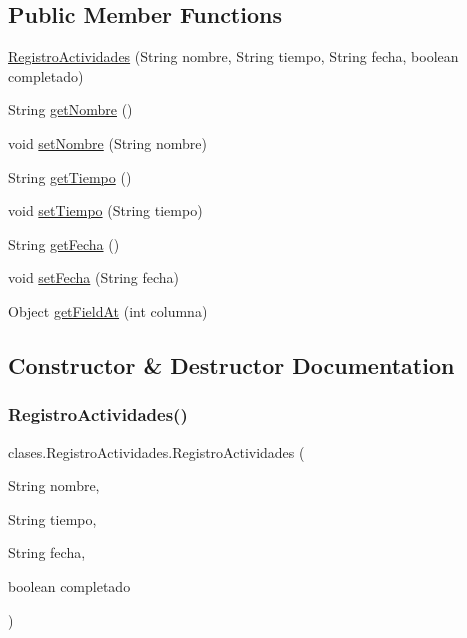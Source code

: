 \subsection*{Public Member Functions}
\begin{DoxyCompactItemize}
\item 
\mbox{\hyperlink{classclases_1_1_registro_actividades_a024588a40718bcdafca472f9ead9f57d}{Registro\+Actividades}} (String nombre, String tiempo, String fecha, boolean completado)
\item 
String \mbox{\hyperlink{classclases_1_1_registro_actividades_a9984e514a1c330fe6d0c4470ad8c2f92}{get\+Nombre}} ()
\item 
void \mbox{\hyperlink{classclases_1_1_registro_actividades_a508d70a72b0d5a122068ad4031a66af0}{set\+Nombre}} (String nombre)
\item 
String \mbox{\hyperlink{classclases_1_1_registro_actividades_afbe2b3b67d60b42f4e110c0f05514850}{get\+Tiempo}} ()
\item 
void \mbox{\hyperlink{classclases_1_1_registro_actividades_a6fbf13972bbe9cfc5c5b2601e280b615}{set\+Tiempo}} (String tiempo)
\item 
String \mbox{\hyperlink{classclases_1_1_registro_actividades_a0a5376b0c5899d26b845381b73983d3e}{get\+Fecha}} ()
\item 
void \mbox{\hyperlink{classclases_1_1_registro_actividades_aed408c87acaea7bf25e63d726b85f28b}{set\+Fecha}} (String fecha)
\item 
Object \mbox{\hyperlink{classclases_1_1_registro_actividades_a2db7606bb64aa1fa92ee87365bdf5ae3}{get\+Field\+At}} (int columna)
\end{DoxyCompactItemize}


\subsection{Constructor \& Destructor Documentation}
\mbox{\label{classclases_1_1_registro_actividades_a024588a40718bcdafca472f9ead9f57d}} 
\subsubsection{\texorpdfstring{Registro\+Actividades()}{RegistroActividades()}}
{\footnotesize\ttfamily clases.\+Registro\+Actividades.\+Registro\+Actividades (\begin{DoxyParamCaption}\item[{String}]{nombre,  }\item[{String}]{tiempo,  }\item[{String}]{fecha,  }\item[{boolean}]{completado }\end{DoxyParamCaption})}



